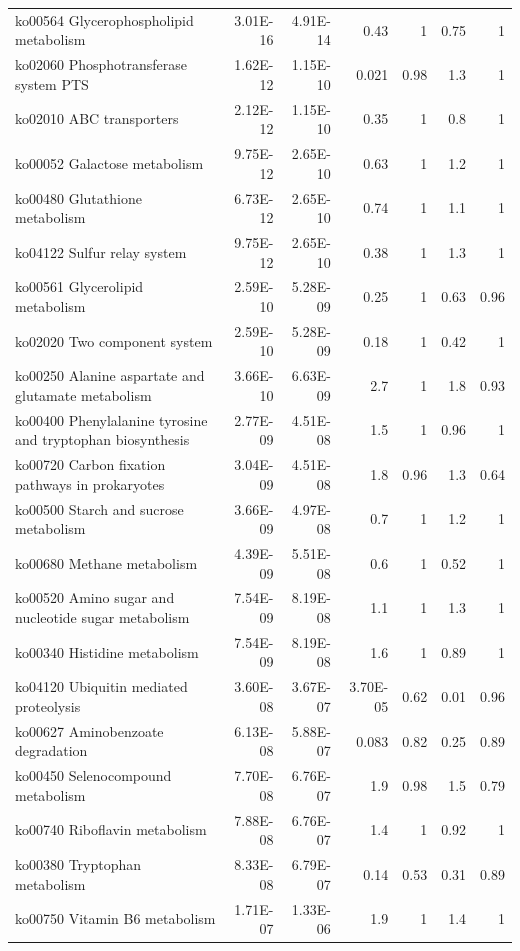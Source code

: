 {\begin{longtable}{ | l | r | r | r | r | r | r  | }
		
		ko00564 Glycerophospholipid metabolism & 3.01E-16 & 4.91E-14 & 0.43 & 1 & 0.75 & 1 \\ 
		ko02060 Phosphotransferase system PTS  & 1.62E-12 & 1.15E-10 & 0.021 & 0.98 & 1.3 & 1 \\ 
		ko02010 ABC transporters & 2.12E-12 & 1.15E-10 & 0.35 & 1 & 0.8 & 1 \\ 
		ko00052 Galactose metabolism & 9.75E-12 & 2.65E-10 & 0.63 & 1 & 1.2 & 1 \\ 
		ko00480 Glutathione metabolism & 6.73E-12 & 2.65E-10 & 0.74 & 1 & 1.1 & 1 \\ 
		ko04122 Sulfur relay system & 9.75E-12 & 2.65E-10 & 0.38 & 1 & 1.3 & 1 \\ 
		ko00561 Glycerolipid metabolism & 2.59E-10 & 5.28E-09 & 0.25 & 1 & 0.63 & 0.96 \\ 
		ko02020 Two component system & 2.59E-10 & 5.28E-09 & 0.18 & 1 & 0.42 & 1 \\ 
		ko00250 Alanine aspartate and glutamate metabolism & 3.66E-10 & 6.63E-09 & 2.7 & 1 & 1.8 & 0.93 \\ 
		ko00400 Phenylalanine tyrosine and tryptophan biosynthesis & 2.77E-09 & 4.51E-08 & 1.5 & 1 & 0.96 & 1 \\ 
		ko00720 Carbon fixation pathways in prokaryotes & 3.04E-09 & 4.51E-08 & 1.8 & 0.96 & 1.3 & 0.64 \\ 
		ko00500 Starch and sucrose metabolism & 3.66E-09 & 4.97E-08 & 0.7 & 1 & 1.2 & 1 \\ 
		ko00680 Methane metabolism & 4.39E-09 & 5.51E-08 & 0.6 & 1 & 0.52 & 1 \\ 
		ko00520 Amino sugar and nucleotide sugar metabolism & 7.54E-09 & 8.19E-08 & 1.1 & 1 & 1.3 & 1 \\ 
		ko00340 Histidine metabolism & 7.54E-09 & 8.19E-08 & 1.6 & 1 & 0.89 & 1 \\ 
		ko04120 Ubiquitin mediated proteolysis & 3.60E-08 & 3.67E-07 & 3.70E-05 & 0.62 & 0.01 & 0.96 \\ 
		ko00627 Aminobenzoate degradation & 6.13E-08 & 5.88E-07 & 0.083 & 0.82 & 0.25 & 0.89 \\ 
		ko00450 Selenocompound metabolism & 7.70E-08 & 6.76E-07 & 1.9 & 0.98 & 1.5 & 0.79 \\ 
		ko00740 Riboflavin metabolism & 7.88E-08 & 6.76E-07 & 1.4 & 1 & 0.92 & 1 \\ 
		ko00380 Tryptophan metabolism & 8.33E-08 & 6.79E-07 & 0.14 & 0.53 & 0.31 & 0.89 \\ 
		ko00750 Vitamin B6 metabolism & 1.71E-07 & 1.33E-06 & 1.9 & 1 & 1.4 & 1 \\ 

\end{longtable}}
